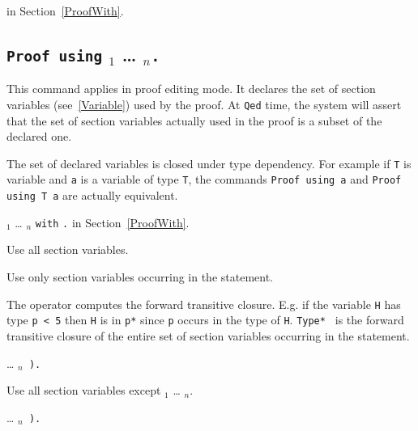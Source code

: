  in Section~\ref{ProofWith}.

\subsection[{\tt Proof using} {\ident$_1$} {\ldots} {\ident$_n$}{\tt .}]
{{\tt Proof using} {\ident$_1$} {\ldots} {\ident$_n$}{\tt .}
 \label{ProofUsing}}

This command applies in proof editing mode. 
It declares the set of section variables (see~\ref{Variable}) 
used by the proof. At {\tt Qed} time, the system will assert that 
the set of section variables actually used in the proof is a subset of
the declared one.

The set of declared variables is closed under type dependency.
For example if {\tt T} is variable and {\tt a} is a variable of
type {\tt T}, the commands {\tt Proof using a} and
{\tt Proof using T a} are actually equivalent.

 {\ident$_1$} {\ldots} {\ident$_n$} {\tt with} {\tac}{\tt .} 
in Section~\ref{ProofWith}.


  Use all section variables.

  
  Use only section variables occurring in the statement.

  
  The {\tt *} operator computes the forward transitive closure.
  E.g. if the variable {\tt H} has type {\tt p < 5} then {\tt H} is
  in {\tt p*} since {\tt p} occurs in the type of {\tt H}.
  {\tt Type* } is the forward transitive closure of the entire set of
  section variables occurring in the statement.

 {\ldots} {\tt \ident$_n$  ).}
  
  Use all section variables except {\ident$_1$} {\ldots} {\ident$_n$}.



 {\ldots} {\tt \ident$_n$ ).}


